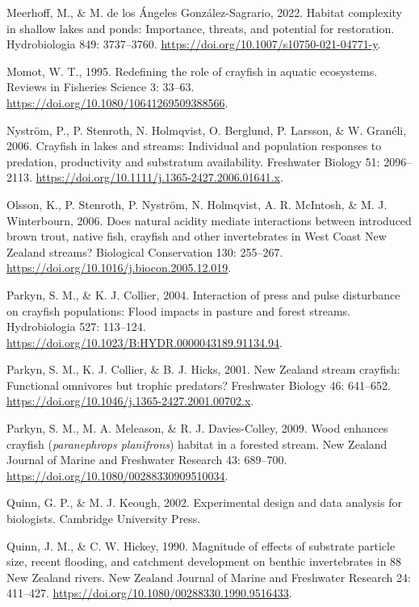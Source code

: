 \documentclass[
  letterpaper,
  DIV=11,
  numbers=noendperiod]{scrartcl}
\newlength{\cslhangindent}
\newenvironment{CSLReferences}[2] %
 {\begin{list}{}{%
  \setlength{\itemindent}{0pt}
  \setlength{\leftmargin}{0pt}
  \setlength{\parsep}{0pt}
  \ifodd #1
   \setlength{\leftmargin}{\cslhangindent}
   \setlength{\itemindent}{-1\cslhangindent}
  \fi
  \setlength{\itemsep}{#2\baselineskip}}}
 {\end{list}}
\begin{document}
\begin{CSLReferences}{0}{1}
Meerhoff, M., \& M. de los Ángeles González-Sagrario, 2022. Habitat
complexity in shallow lakes and ponds: Importance, threats, and
potential for restoration. Hydrobiologia 849: 3737--3760.
\url{https://doi.org/10.1007/s10750-021-04771-y}.

Momot, W. T., 1995. Redefining the role of crayfish in aquatic
ecosystems. Reviews in Fisheries Science 3: 33--63.
\url{https://doi.org/10.1080/10641269509388566}.

Nyström, P., P. Stenroth, N. Holmqvist, O. Berglund, P. Larsson, \& W.
Granéli, 2006. Crayfish in lakes and streams: Individual and population
responses to predation, productivity and substratum availability.
Freshwater Biology 51: 2096--2113.
\url{https://doi.org/10.1111/j.1365-2427.2006.01641.x}.

Olsson, K., P. Stenroth, P. Nyström, N. Holmqvist, A. R. McIntosh, \& M.
J. Winterbourn, 2006. Does natural acidity mediate interactions between
introduced brown trout, native fish, crayfish and other invertebrates in
{West Coast New Zealand} streams? Biological Conservation 130: 255--267.
\url{https://doi.org/10.1016/j.biocon.2005.12.019}.

Parkyn, S. M., \& K. J. Collier, 2004. Interaction of press and pulse
disturbance on crayfish populations: Flood impacts in pasture and forest
streams. Hydrobiologia 527: 113--124.
\url{https://doi.org/10.1023/B:HYDR.0000043189.91134.94}.

Parkyn, S. M., K. J. Collier, \& B. J. Hicks, 2001. New {Zealand} stream
crayfish: Functional omnivores but trophic predators? Freshwater Biology
46: 641--652. \url{https://doi.org/10.1046/j.1365-2427.2001.00702.x}.

Parkyn, S. M., M. A. Meleason, \& R. J. Davies-Colley, 2009. Wood
enhances crayfish (\emph{paranephrops planifrons}) habitat in a forested
stream. New Zealand Journal of Marine and Freshwater Research 43:
689--700. \url{https://doi.org/10.1080/00288330909510034}.

Quinn, G. P., \& M. J. Keough, 2002. Experimental design and data
analysis for biologists. Cambridge University Press.

Quinn, J. M., \& C. W. Hickey, 1990. Magnitude of effects of substrate
particle size, recent flooding, and catchment development on benthic
invertebrates in 88 {New Zealand} rivers. New Zealand Journal of Marine
and Freshwater Research 24: 411--427.
\url{https://doi.org/10.1080/00288330.1990.9516433}.


\end{CSLReferences}
\end{document}
